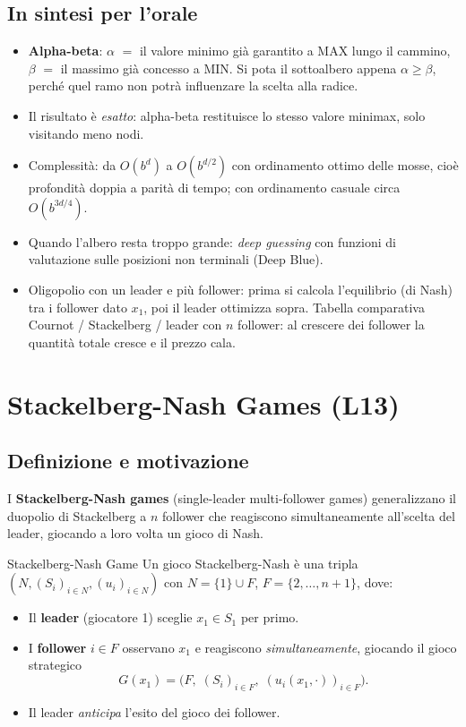 \documentclass[12pt,a4paper,twoside]{book}
\theoremstyle{plain}
\theoremstyle{definition}
\begin{document}
\section*{In sintesi per l'orale}
\begin{itemize}
  \item \textbf{Alpha-beta}: $\alpha$ $=$ il valore minimo già garantito a MAX lungo il cammino, $\beta$ $=$ il massimo già concesso a MIN. Si pota il sottoalbero appena $\alpha\ge\beta$, perché quel ramo non potrà influenzare la scelta alla radice.
  \item Il risultato è \emph{esatto}: alpha-beta restituisce lo stesso valore minimax, solo visitando meno nodi.
  \item Complessità: da $O(b^d)$ a $O(b^{d/2})$ con ordinamento ottimo delle mosse, cioè profondità doppia a parità di tempo; con ordinamento casuale circa $O(b^{3d/4})$.
  \item Quando l'albero resta troppo grande: \emph{deep guessing} con funzioni di valutazione sulle posizioni non terminali (Deep Blue).
  \item Oligopolio con un leader e più follower: prima si calcola l'equilibrio (di Nash) tra i follower dato $x_1$, poi il leader ottimizza sopra. Tabella comparativa Cournot / Stackelberg / leader con $n$ follower: al crescere dei follower la quantità totale cresce e il prezzo cala.
\end{itemize}

\chapter{Stackelberg-Nash Games (L13)}
\label{ch:stackelberg-nash}

\section{Definizione e motivazione}

I \textbf{Stackelberg-Nash games} (single-leader multi-follower games) generalizzano il duopolio di Stackelberg a $n$ follower che reagiscono simultaneamente all'scelta del leader, giocando a loro volta un gioco di Nash.

\begin{defbox}{Stackelberg-Nash Game}
Un gioco Stackelberg-Nash è una tripla $(N,(S_i)_{i\in N},(u_i)_{i\in N})$ con $N=\{1\}\cup F$, $F=\{2,\dots,n+1\}$, dove:
\begin{itemize}
  \item Il \textbf{leader} (giocatore 1) sceglie $x_1\in S_1$ per primo.
  \item I \textbf{follower} $i\in F$ osservano $x_1$ e reagiscono \emph{simultaneamente}, giocando il gioco strategico
    \[G(x_1) = \bigl(F,\;(S_i)_{i\in F},\;(u_i(x_1,\cdot))_{i\in F}\bigr).\]
  \item Il leader \emph{anticipa} l'esito del gioco dei follower.
\end{itemize}
\end{defbox}
\end{document}
